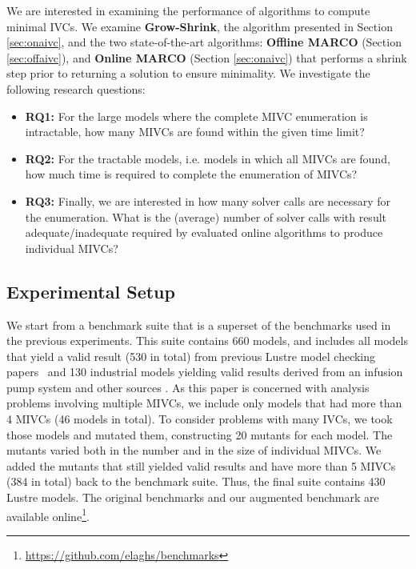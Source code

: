 We are interested in examining the performance of algorithms to compute minimal IVCs.
We examine \textbf{Grow-Shrink}, the algorithm presented in Section \ref{sec:onaivc}, and the two state-of-the-art algorithms: \textbf{Offline MARCO} (\aivcalg Section \ref{sec:offaivc}), and \textbf{Online MARCO} (Section \ref{sec:onaivc}) that performs a shrink step prior to returning a solution to ensure minimality.
We investigate the following research questions:
\begin{itemize}
  \item \textbf{RQ1:} For the large models where the complete MIVC enumeration is intractable,
how many MIVCs are found within the given time limit?
  \item \textbf{RQ2:} For the tractable models, i.e. models in which all MIVCs are found, how much time is required to complete the enumeration of MIVCs?
  \item \textbf{RQ3:} Finally, we are interested in how many solver calls are necessary for the enumeration. What is the (average) number of solver calls with result adequate/inadequate required by evaluated online algorithms to produce individual MIVCs?
\end{itemize}

\subsection{Experimental Setup}
  We start from a benchmark suite that is a superset of the benchmarks used in the previous experiments. This suite contains 660 models, and includes all models that yield a valid result (530 in total) from previous Lustre model checking papers~\cite{Hagen08:FMCAD,piskac2016} and 130 industrial models yielding valid results derived from an infusion pump system \cite{hilt2013} and other sources \cite{piskac2016,NFM2015:backes}.
As this paper is concerned with analysis problems involving multiple MIVCs, we include only models that had more than 4 MIVCs (46 models in total).  To consider problems with many IVCs, we took those models and mutated them, constructing 20 mutants for each model. The mutants varied both in the number and in the size of individual MIVCs.
We added the mutants that still yielded valid results and have more than 5 MIVCs (384 in total) back to the benchmark suite.
Thus, the final suite contains 430 Lustre models. The original benchmarks and our augmented benchmark are available online\footnote{\url{https://github.com/elaghs/benchmarks}}.

